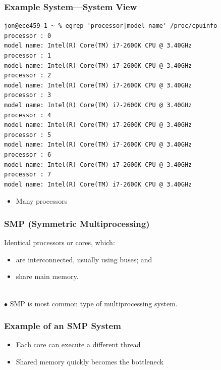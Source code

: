 \begin{frame}[fragile]
  \frametitle{Example System---System View}

  \scriptsize
  \begin{lstlisting}
jon@ece459-1 ~ % egrep 'processor|model name' /proc/cpuinfo 
processor : 0
model name: Intel(R) Core(TM) i7-2600K CPU @ 3.40GHz
processor : 1
model name: Intel(R) Core(TM) i7-2600K CPU @ 3.40GHz
processor : 2
model name: Intel(R) Core(TM) i7-2600K CPU @ 3.40GHz
processor : 3
model name: Intel(R) Core(TM) i7-2600K CPU @ 3.40GHz
processor : 4
model name: Intel(R) Core(TM) i7-2600K CPU @ 3.40GHz
processor : 5
model name: Intel(R) Core(TM) i7-2600K CPU @ 3.40GHz
processor : 6
model name: Intel(R) Core(TM) i7-2600K CPU @ 3.40GHz
processor : 7
model name: Intel(R) Core(TM) i7-2600K CPU @ 3.40GHz
  \end{lstlisting}

  \begin{itemize}
    \item Many processors
  \end{itemize}
\end{frame}

\begin{frame}
  \frametitle{SMP (Symmetric Multiprocessing)}

    Identical processors or cores, which:
    \begin{itemize}
    \item are interconnected, usually using buses; and
    \item share main memory.
    \end{itemize}
    ~\\[1em]
    $\bullet$ SMP is most common type of multiprocessing system.

\end{frame}

\begin{frame}
  \frametitle{Example of an SMP System}
\begin{center}
\end{center}

  \begin{itemize}
    \item Each core can execute a different thread
    \item Shared memory quickly becomes the bottleneck
  \end{itemize}
\end{frame}

